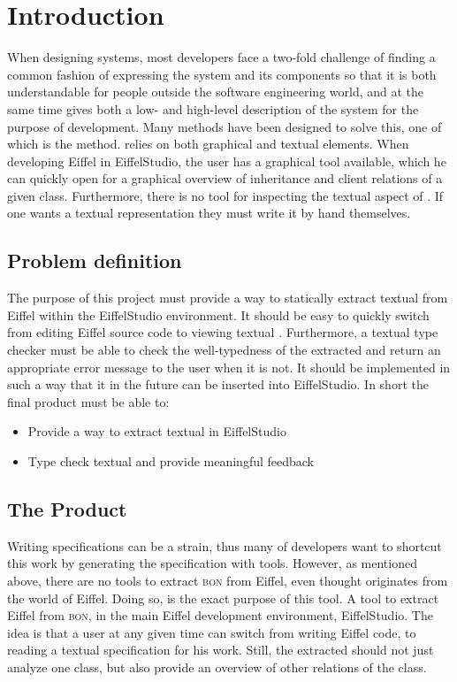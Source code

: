 \chapter{Introduction}
\label{sec:introduction}
When designing systems, most developers face a two-fold challenge of finding a common fashion of expressing the system and its components so that it is both understandable for people outside the software engineering world, and at the same time gives both a low- and high-level description of the system for the purpose of development. Many methods have been designed to solve this, one of which is the \bon{} method. \bon{} relies on both graphical and textual elements. When developing Eiffel in EiffelStudio, the user has a graphical \bon{} tool available, which he can quickly open for a graphical overview of inheritance and client relations of a given class. Furthermore, there is no tool for inspecting the textual aspect of \bon. If one wants a textual representation they must write it by hand themselves.

\section{Problem definition}
The purpose of this project must provide a way to statically extract textual \bon{} from Eiffel within the EiffelStudio environment. It should be easy to quickly switch from editing Eiffel source code to viewing textual \bon. Furthermore, a textual \bon{} type checker must be able to check the well-typedness of the extracted \bon{} and return an appropriate error message to the user when it is not. It should be implemented in such a way that it in the future can be inserted into EiffelStudio. \newline\newline In short the final product must be able to:
\begin{itemize}
 
  \item Provide a way to extract textual \bon{} in EiffelStudio
  \item Type check textual \bon{} and provide meaningful feedback
 
\end{itemize}

\section{The Product}
Writing specifications can be a strain, thus many of developers want to shortcut this work by generating the specification with tools. However, as mentioned above, there are no tools to extract \textsc{bon} from Eiffel, even thought \bon{} originates from the world of Eiffel. Doing so, is the exact purpose of this tool. A tool to extract Eiffel from \textsc{bon}, in the main Eiffel development environment, EiffelStudio. The idea is that a user at any given time can switch from writing Eiffel code, to reading a textual \bon{} specification for his work. Still, the extracted \bon{} should not just analyze one class, but also provide an overview of other relations of the class.

